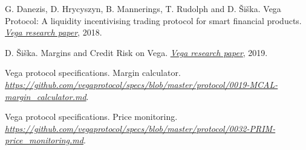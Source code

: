 \documentclass[10pt]{article}
\begin{document}
\begin{thebibliography}{10}
G. Danezis, D. Hrycyszyn, B. Mannerings, T. Rudolph and D. \v{S}i\v{s}ka. Vega Protocol: A liquidity incentivising trading protocol for smart financial products. {\em \href{https://vega.xyz/papers/}{Vega research paper}}, 2018.

D. \v{S}i\v{s}ka. Margins and Credit Risk on Vega. {\em \href{https://vega.xyz/papers/}{Vega research paper}}, 2019.

Vega protocol specifications. Margin calculator.\\ {\em \href{https://github.com/vegaprotocol/specs/blob/master/protocol/0019-MCAL-margin_calculator.md}{https://github.com/vegaprotocol/specs/blob/master/protocol/0019-MCAL-margin\_calculator.md}}.

Vega protocol specifications. Price monitoring.\\ {\em \href{https://github.com/vegaprotocol/specs/blob/master/protocol/0032-PRIM-price_monitoring.md}{https://github.com/vegaprotocol/specs/blob/master/protocol/0032-PRIM-price\_monitoring.md}}.



%








\end{thebibliography}
\end{document}
